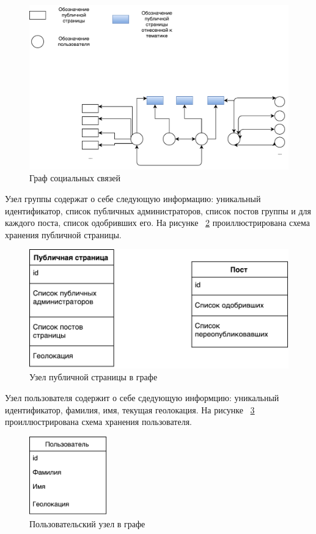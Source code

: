 \documentclass[annotation,times,page4]{itmo-student-thesis}
\begin{document}
\begin{figure}[!h]
\caption{Граф социальных связей}
\label{fig:grapth}
\centering
\includegraphics[width=\textwidth]{figs/graph.pdf}
\end{figure}

Узел группы содержат о себе следующую информацию: уникальный идентификатор, список публичных администраторов, список постов группы и для каждого поста, список одобривших его. На рисунке ~\ref{fig:public} проиллюстрирована схема хранения публичной страницы.

\begin{figure}[!h]
\caption{Узел публичной страницы в графе}
\label{fig:public}
\centering
\includegraphics[width=\textwidth]{figs/public.pdf}
\end{figure}

Узел пользователя содержит о себе сдедующую информцию: уникальный идентификатор, фамилия, имя, текущая геолокация. На рисунке ~\ref{fig:user} проиллюстрирована схема хранения пользователя.

\begin{figure}[!h]
\caption{Пользовательский узел в графе}
\label{fig:user}
\centering
\includegraphics[width=0.3\textwidth]{figs/user.pdf}
\end{figure}
\end{document}
